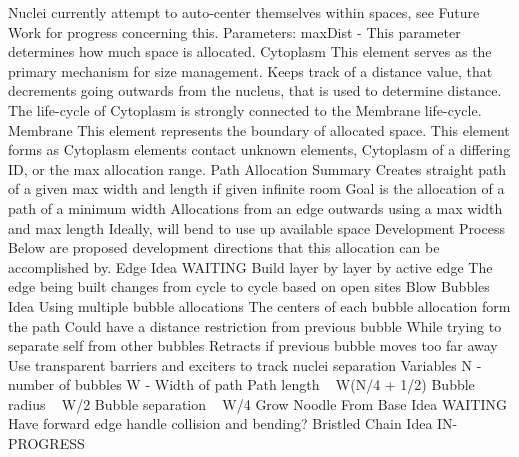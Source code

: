 \documentclass[article,12pt,oneside]{memoir}
\begin{document}
Nuclei currently attempt to auto-center themselves within spaces, see Future Work for progress concerning this.
Parameters:
maxDist - This parameter determines how much space is allocated.
Cytoplasm
This element serves as the primary mechanism for size management.
Keeps track of a distance value, that decrements going outwards from the nucleus, that is used to determine distance.
The life-cycle of Cytoplasm is strongly connected to the Membrane life-cycle.
Membrane
This element represents the boundary of allocated space.
This element forms as Cytoplasm elements contact unknown elements, Cytoplasm of a differing ID, or the max allocation range.
Path Allocation
Summary
Creates straight path of a given max width and length if given infinite room
Goal is the allocation of a path of a minimum width
Allocations from an edge outwards using a max width and max length
Ideally, will bend to use up available space
Development Process
Below are proposed development directions that this allocation can be accomplished by.
Edge Idea
WAITING
Build layer by layer by active edge
The edge being built changes from cycle to cycle based on open sites
Blow Bubbles Idea
Using multiple bubble allocations
The centers of each bubble allocation form the path
Could have a distance restriction from previous bubble
While trying to separate self from other bubbles
Retracts if previous bubble moves too far away
Use transparent barriers and exciters to track nuclei separation
Variables
N - number of bubbles
W - Width of path
Path length ~ W(N/4 + 1/2)
Bubble radius ~ W/2
Bubble separation ~ W/4
Grow Noodle From Base Idea
WAITING
Have forward edge handle collision and bending?
Bristled Chain Idea
IN-PROGRESS
\end{document}
